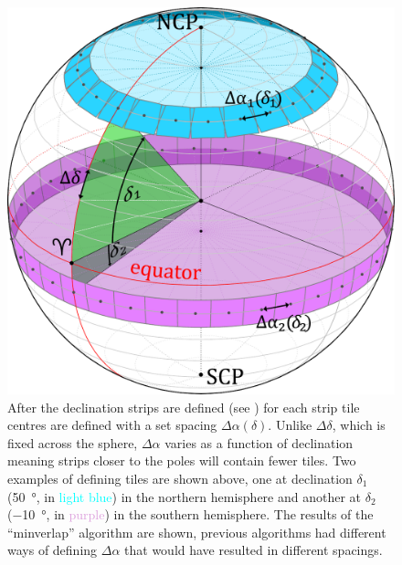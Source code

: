 \begin{colsection}
\begin{colsection}
\begin{figure}[p]
    \begin{center}
        \includegraphics[width=\linewidth]{images/globe3.pdf}
    \end{center}
    \caption[Defining the spacing between tiles]{
        After the declination strips are defined (see ) for each strip tile centres are defined with a set spacing $\Delta\alpha(\delta)$. Unlike $\Delta\delta$, which is fixed across the sphere, $\Delta\alpha$ varies as a function of declination meaning strips closer to the poles will contain fewer tiles. Two examples of defining tiles are shown above, one at declination $\delta_1$ (\SI{50}{\degree}, in \textcolor{cyan}{light blue}) in the northern hemisphere and another at $\delta_2$ (\SI{-10}{\degree}, in \textcolor{Plum}{purple}) in the southern hemisphere. The results of the ``minverlap'' algorithm are shown, previous algorithms had different ways of defining $\Delta\alpha$ that would have resulted in different spacings.
    }\label{fig:deltaalpha}
\end{figure}


\end{colsection}
\end{colsection}
